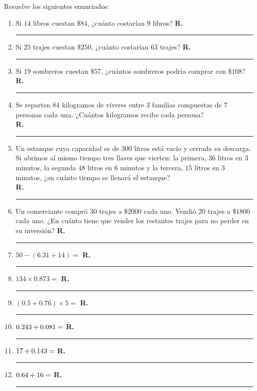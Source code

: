 Resuelve los siguientes enunciados:
\begin{enumerate}[label=\alph*)]
\item Si $14$ libros cuestan $\$ 84$, ¿cuánto costarían $9$ libros? \textbf{R.} \rule{2cm}{0.1mm}
\item Si $25$ trajes cuestan $\$ 250$, ¿cuánto costarían $63$ trajes? \textbf{R.} \rule{2cm}{0.1mm}
\item Si $19$ sombreros cuestan $\$ 57$, ¿cuántos sombreros podría comprar con $\$ 108$? \textbf{R.} \rule{2cm}{0.1mm}
\item Se reparten $84$ kilogramos de víveres entre $3$ familias compuestas de $7$ personas cada una. ¿Cuántos kilogramos recibe cada persona? 
\\
\textbf{R.} \rule{2cm}{0.1mm}
\item Un estanque cuya capacidad es de $300$ litros está vacío y cerrada su descarga. Si abrimos al mismo tiempo tres llaves que vierten: la primera, $36$ litros en $3$ minutos, la segunda $48$ litros en $6$ minutos y la tercera, $15$ litros en $3$ minutos, ¿en cuánto tiempo se llenará el estanque? \\
 \textbf{R.} \rule{2cm}{0.1mm}
 \item Un comerciante compró $30$ trajes a $\$ 2000$ cada uno. Vendió $20$ trajes a $\$ 1800$ cada uno. ¿En cuánto tiene que vender los restantes trajes para no perder en su inversión? \textbf{R.} \rule{2cm}{0.1mm}
 \item $50 - (6.31 + 14) = $ \textbf{R.} \rule{2cm}{0.1mm}
 \item $134 \times 0.873 =$ \textbf{R.} \rule{2cm}{0.1mm}
 \item $(0.5 + 0.76) \times 5 =$ \textbf{R.} \rule{2cm}{0.1mm}
 \item $0.243 \divisionsymbol 0.081 =$ \textbf{R.} \rule{2cm}{0.1mm}
 \item $17 \divisionsymbol 0.143 =$ \textbf{R.} \rule{2cm}{0.1mm}
 \item $0.64 \divisionsymbol 16 =$ \textbf{R.} \rule{2cm}{0.1mm}
\end{enumerate}

